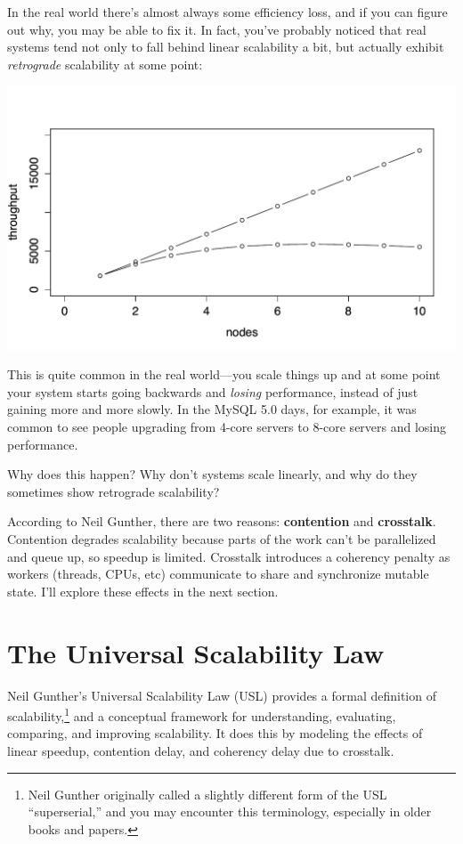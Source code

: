 \documentclass{vivid_layout}
\begin{document}
In the real world there's almost always some efficiency loss, and if you can
figure out why, you may be able to fix it. In fact, you've probably noticed that
real systems tend not only to fall behind linear scalability a bit, but actually
exhibit {\itshape retrograde} scalability at some point:
\begin{center}
\includegraphics[width=.85\linewidth]{scalability/linear3}
\end{center}
This is quite common in the real world---you scale things up and at some point
your system starts going backwards and {\itshape losing} performance, instead of
just gaining more and more slowly. In the MySQL 5.0 days, for example, it was
common to see people upgrading from 4-core servers to 8-core servers and losing
performance.

Why does this happen? Why don't systems scale linearly, and why do they
sometimes show retrograde scalability?

According to Neil Gunther, there are two reasons: {\bfseries contention} and
{\bfseries crosstalk}. Contention degrades scalability because parts of the work
can't be parallelized and queue up, so speedup is limited. Crosstalk introduces
a coherency penalty as workers (threads, CPUs, etc) communicate to share and
synchronize mutable state. I'll explore these effects in the next section.

\section{The Universal Scalability Law}

Neil Gunther's Universal Scalability Law (USL) provides a formal definition of
scalability,\footnote{Neil Gunther originally called a slightly different form
of the USL ``superserial,'' and you may encounter this terminology, especially
in older books and papers.} and a conceptual framework for understanding,
evaluating, comparing, and improving scalability. It does this by modeling
the effects of linear speedup, contention delay, and coherency delay due to
crosstalk.
\end{document}
